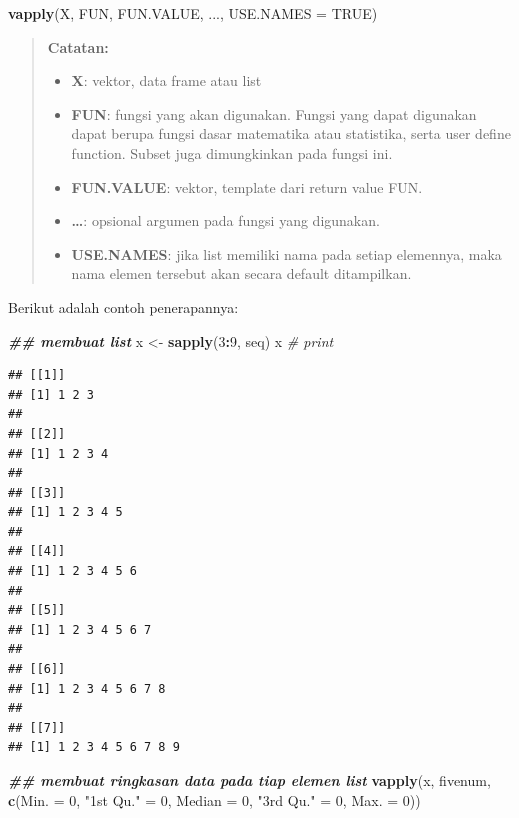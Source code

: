 \documentclass[
]{book}
\newenvironment{Shaded}{\begin{snugshade}}{\end{snugshade}}
\newcommand{\AttributeTok}[1]{\textcolor[rgb]{0.13,0.29,0.53}{#1}}
\newcommand{\CommentTok}[1]{\textcolor[rgb]{0.56,0.35,0.01}{\textit{#1}}}
\newcommand{\ConstantTok}[1]{\textcolor[rgb]{0.56,0.35,0.01}{#1}}
\newcommand{\DecValTok}[1]{\textcolor[rgb]{0.00,0.00,0.81}{#1}}
\newcommand{\DocumentationTok}[1]{\textcolor[rgb]{0.56,0.35,0.01}{\textbf{\textit{#1}}}}
\newcommand{\FunctionTok}[1]{\textcolor[rgb]{0.13,0.29,0.53}{\textbf{#1}}}
\newcommand{\NormalTok}[1]{#1}
\newcommand{\OtherTok}[1]{\textcolor[rgb]{0.56,0.35,0.01}{#1}}
\newcommand{\SpecialCharTok}[1]{\textcolor[rgb]{0.81,0.36,0.00}{\textbf{#1}}}
\newcommand{\StringTok}[1]{\textcolor[rgb]{0.31,0.60,0.02}{#1}}
\providecommand{\tightlist}{%
  \setlength{\itemsep}{0pt}\setlength{\parskip}{0pt}}
\theoremstyle{definition}
\theoremstyle{definition}
\theoremstyle{definition}
\theoremstyle{definition}
\theoremstyle{remark}
\begin{document}
\begin{Shaded}
\begin{Highlighting}[]
\FunctionTok{vapply}\NormalTok{(X, FUN, FUN.VALUE, ..., }\AttributeTok{USE.NAMES =} \ConstantTok{TRUE}\NormalTok{)}
\end{Highlighting}
\end{Shaded}

\begin{quote}
\textbf{Catatan:}

\begin{itemize}
\tightlist
\item
  \textbf{X}: vektor, data frame atau list
\item
  \textbf{FUN}: fungsi yang akan digunakan. Fungsi yang dapat digunakan dapat berupa fungsi dasar matematika atau statistika, serta user define function. Subset juga dimungkinkan pada fungsi ini.
\item
  \textbf{FUN.VALUE}: vektor, template dari return value FUN.
\item
  \textbf{\ldots{}}: opsional argumen pada fungsi yang digunakan.
\item
  \textbf{USE.NAMES}: jika list memiliki nama pada setiap elemennya, maka nama elemen tersebut akan secara default ditampilkan.
\end{itemize}
\end{quote}

Berikut adalah contoh penerapannya:

\begin{Shaded}
\begin{Highlighting}[]
\DocumentationTok{\#\# membuat list}
\NormalTok{x }\OtherTok{\textless{}{-}} \FunctionTok{sapply}\NormalTok{(}\DecValTok{3}\SpecialCharTok{:}\DecValTok{9}\NormalTok{, seq)}
\NormalTok{x }\CommentTok{\# print}
\end{Highlighting}
\end{Shaded}

\begin{verbatim}
## [[1]]
## [1] 1 2 3
## 
## [[2]]
## [1] 1 2 3 4
## 
## [[3]]
## [1] 1 2 3 4 5
## 
## [[4]]
## [1] 1 2 3 4 5 6
## 
## [[5]]
## [1] 1 2 3 4 5 6 7
## 
## [[6]]
## [1] 1 2 3 4 5 6 7 8
## 
## [[7]]
## [1] 1 2 3 4 5 6 7 8 9
\end{verbatim}

\begin{Shaded}
\begin{Highlighting}[]
\DocumentationTok{\#\# membuat ringkasan data pada tiap elemen list}
\FunctionTok{vapply}\NormalTok{(x, fivenum,}
       \FunctionTok{c}\NormalTok{(}\AttributeTok{Min. =} \DecValTok{0}\NormalTok{, }\StringTok{"1st Qu."} \OtherTok{=} \DecValTok{0}\NormalTok{, }
         \AttributeTok{Median =} \DecValTok{0}\NormalTok{, }\StringTok{"3rd Qu."} \OtherTok{=} \DecValTok{0}\NormalTok{, }\AttributeTok{Max. =} \DecValTok{0}\NormalTok{))}
\end{Highlighting}
\end{Shaded}
\end{document}
